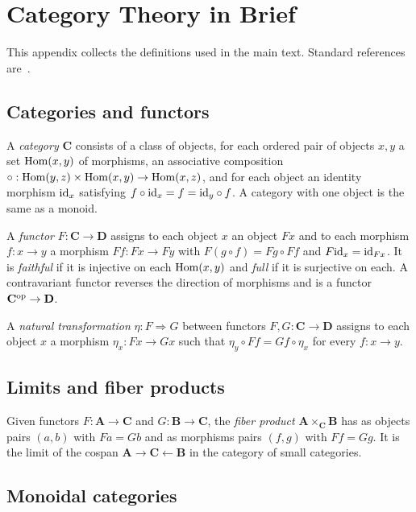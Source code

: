 \chapter{Category Theory in Brief}
\label{app:cat}

This appendix collects the definitions used in the main text. Standard references are~\cite{maclane1998,awodey2010}.

\section*{Categories and functors}

A \emph{category} $\mathbf{C}$ consists of a class of objects, for each ordered pair of objects $x,y$ a set $\operatorname{Hom}(x,y)$ of morphisms, an associative composition $\circ:\operatorname{Hom}(y,z)\times\operatorname{Hom}(x,y)\to\operatorname{Hom}(x,z)$, and for each object an identity morphism $\mathrm{id}_x$ satisfying $f\circ\mathrm{id}_x=f=\mathrm{id}_y\circ f$. A category with one object is the same as a monoid.

A \emph{functor} $F:\mathbf{C}\to\mathbf{D}$ assigns to each object $x$ an object $Fx$ and to each morphism $f:x\to y$ a morphism $Ff:Fx\to Fy$ with $F(g\circ f)=Fg\circ Ff$ and $F\mathrm{id}_x=\mathrm{id}_{Fx}$. It is \emph{faithful} if it is injective on each $\operatorname{Hom}(x,y)$ and \emph{full} if it is surjective on each. A contravariant functor reverses the direction of morphisms and is a functor $\mathbf{C}^{\mathrm{op}}\to\mathbf{D}$.

A \emph{natural transformation} $\eta:F\Rightarrow G$ between functors $F,G:\mathbf{C}\to\mathbf{D}$ assigns to each object $x$ a morphism $\eta_x:Fx\to Gx$ such that $\eta_y\circ Ff=Gf\circ\eta_x$ for every $f:x\to y$.

\section*{Limits and fiber products}

Given functors $F:\mathbf{A}\to\mathbf{C}$ and $G:\mathbf{B}\to\mathbf{C}$, the \emph{fiber product} $\mathbf{A}\times_{\mathbf{C}}\mathbf{B}$ has as objects pairs $(a,b)$ with $Fa=Gb$ and as morphisms pairs $(f,g)$ with $Ff=Gg$. It is the limit of the cospan $\mathbf{A}\to\mathbf{C}\leftarrow\mathbf{B}$ in the category of small categories.

\section*{Monoidal categories}


